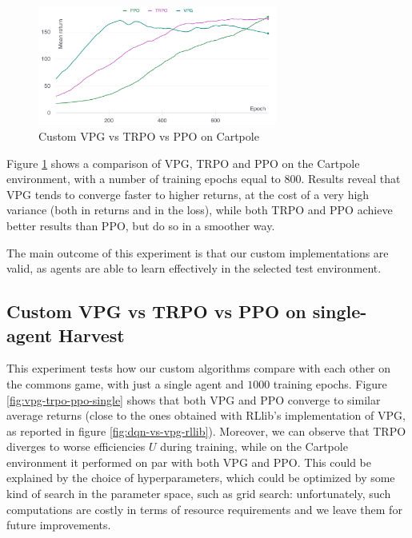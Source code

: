 \documentclass{article}
\begin{document}
\begin{figure}[h]
  \centering
  \includegraphics[width=0.7\textwidth]{../assets/cartpole-pg-return}
  \caption{Custom VPG vs TRPO vs PPO on Cartpole}
  \label{fig:cartpole-pg-return}
\end{figure}

Figure \ref{fig:cartpole-pg-return} shows a comparison of VPG, TRPO and PPO on the Cartpole environment, with a number of training epochs equal to $800$. Results reveal that VPG tends to converge faster to higher returns, at the cost of a very high variance (both in returns and in the loss), while both TRPO and PPO achieve better results than PPO, but do so in a smoother way. 

The main outcome of this experiment is that our custom implementations are valid, as agents are able to learn effectively in the selected test environment.

\subsection{Custom VPG vs TRPO vs PPO on single-agent Harvest}
This experiment tests how our custom algorithms compare with each other on the commons game, with just a single agent and $1000$ training epochs. Figure \ref{fig:vpg-trpo-ppo-single} shows that both VPG and PPO converge to similar average returns (close to the ones obtained with RLlib's implementation of VPG, as reported in figure \ref{fig:dqn-vs-vpg-rllib}). Moreover, we can observe that TRPO diverges to worse efficiencies $U$ during training, while on the Cartpole environment it performed on par with both VPG and PPO. This could be explained by the choice of hyperparameters, which could be optimized by some kind of search in the parameter space, such as grid search: unfortunately, such computations are costly in terms of resource requirements and we leave them for future improvements.
\end{document}
